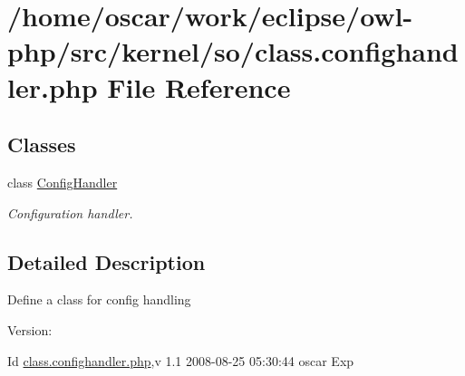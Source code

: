 \hypertarget{class_8confighandler_8php}{
\section{/home/oscar/work/eclipse/owl-php/src/kernel/so/class.confighandler.php File Reference}
\label{class_8confighandler_8php}
}
\subsection*{Classes}
\begin{CompactItemize}
\item 
class \hyperlink{classConfigHandler}{ConfigHandler}
\begin{CompactList}\small\item\em Configuration handler. \item\end{CompactList}\end{CompactItemize}


\subsection{Detailed Description}
Define a class for config handling \begin{Desc}
\item[Version:]\end{Desc}
\begin{Desc}
\item[Id]\hyperlink{class_8confighandler_8php}{class.confighandler.php},v 1.1 2008-08-25 05:30:44 oscar Exp \end{Desc}
